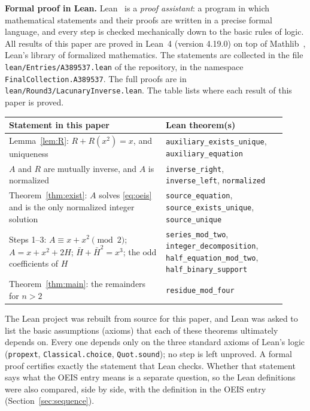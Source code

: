 \documentclass[11pt,a4paper]{article}
\theoremstyle{definition}
\theoremstyle{remark}
\newcommand{\para}[1]{\par\medskip\noindent\textbf{#1}\enspace}
\begin{document}
\para{Formal proof in Lean.}
Lean~\cite{lean} is a \emph{proof assistant}: a program in which mathematical statements and their proofs are written
in a precise formal language, and every step is checked mechanically down to the basic rules of logic. All results of
this paper are proved in Lean~4 (version 4.19.0) on top of Mathlib~\cite{mathlib}, Lean's library of formalized
mathematics. The statements are collected in the file \texttt{lean/Entries/A389537.lean} of the repository,
in the namespace \texttt{FinalCollection.A389537}. The full proofs are in \texttt{lean/Round3/LacunaryInverse.lean}.
The table lists where each result of this paper is proved.
\begin{center}\small\renewcommand{\arraystretch}{1.25}
\begin{tabular}{>{\raggedright\arraybackslash}p{0.52\linewidth}>{\raggedright\arraybackslash}p{0.4\linewidth}}
\toprule
Statement in this paper & Lean theorem(s)\\
\midrule
Lemma~\ref{lem:R}: $R+R(x^2)=x$, and uniqueness & \texttt{auxiliary\_\allowbreak{}exists\_\allowbreak{}unique}, \texttt{auxiliary\_\allowbreak{}equation} \\
$A$ and $R$ are mutually inverse, and $A$ is normalized & \texttt{inverse\_\allowbreak{}right}, \texttt{inverse\_\allowbreak{}left}, \texttt{normalized} \\
Theorem~\ref{thm:exist}: $A$ solves \eqref{eq:oeis} and is the only normalized integer solution & \texttt{source\_\allowbreak{}equation}, \texttt{source\_\allowbreak{}exists\_\allowbreak{}unique}, \texttt{source\_\allowbreak{}unique} \\
Steps 1--3: $A\equiv x+x^2\pmod2$; $A=x+x^2+2H$; $\bar H+\bar H^2=x^3$; the odd coefficients of $H$ & \texttt{series\_\allowbreak{}mod\_\allowbreak{}two}, \texttt{integer\_\allowbreak{}decomposition}, \texttt{half\_\allowbreak{}equation\_\allowbreak{}mod\_\allowbreak{}two}, \texttt{half\_\allowbreak{}binary\_\allowbreak{}support} \\
Theorem~\ref{thm:main}: the remainders for $n>2$ & \texttt{residue\_\allowbreak{}mod\_\allowbreak{}four} \\
\bottomrule
\end{tabular}
\end{center}
The Lean project was rebuilt from source for this paper, and Lean was asked to list the basic assumptions (axioms)
that each of these theorems ultimately depends on. Every one depends only on the three standard axioms of Lean's logic
(\texttt{propext}, \texttt{Classical.choice}, \texttt{Quot.sound}); no step is left unproved. A formal proof certifies
exactly the statement that Lean checks. Whether that statement says what the OEIS entry means is a separate question,
so the Lean definitions were also compared, side by side, with the definition in the OEIS entry
(Section~\ref{sec:sequence}).
\end{document}
